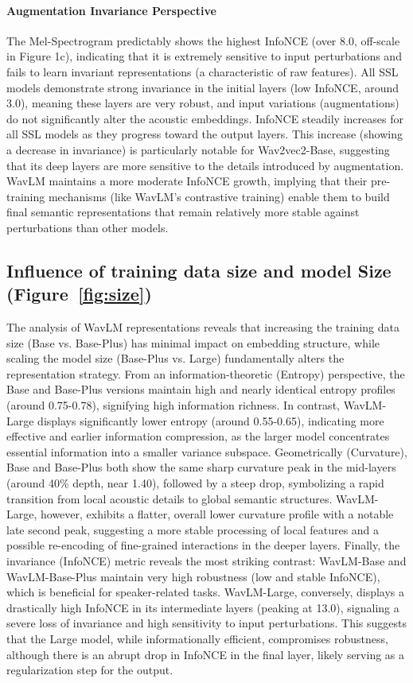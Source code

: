 \documentclass[5p]{elsarticle}
\begin{document}
\paragraph{Augmentation Invariance Perspective} The Mel-Spectrogram predictably shows the highest InfoNCE (over 8.0, off-scale in Figure 1c), indicating that it is extremely sensitive to input perturbations and fails to learn invariant representations (a characteristic of raw features). All SSL models demonstrate strong invariance in the initial layers (low InfoNCE, around 3.0), meaning these layers are very robust, and input variations (augmentations) do not significantly alter the acoustic embeddings. InfoNCE steadily increases for all SSL models as they progress toward the output layers. This increase (showing a decrease in invariance) is particularly notable for Wav2vec2-Base, suggesting that its deep layers are more sensitive to the details introduced by augmentation. WavLM maintains a more moderate InfoNCE growth, implying that their pre-training mechanisms (like WavLM's contrastive training) enable them to build final semantic representations that remain relatively more stable against perturbations than other models.


\subsection{Influence of training data size and model Size (Figure~\ref{fig:size})} The analysis of WavLM representations reveals that increasing the training data size (Base vs. Base-Plus) has minimal impact on embedding structure, while scaling the model size (Base-Plus vs. Large) fundamentally alters the representation strategy. From an information-theoretic (Entropy) perspective, the Base and Base-Plus versions maintain high and nearly identical entropy profiles (around 0.75-0.78), signifying high information richness. In contrast, WavLM-Large displays significantly lower entropy (around 0.55-0.65), indicating more effective and earlier information compression, as the larger model concentrates essential information into a smaller variance subspace. Geometrically (Curvature), Base and Base-Plus both show the same sharp curvature  peak in the mid-layers (around 40\% depth, near 1.40), followed by a steep drop, symbolizing a rapid transition from local acoustic details to global semantic structures. WavLM-Large, however, exhibits a flatter, overall lower curvature profile with a notable late second peak, suggesting a more stable processing of local features and a possible re-encoding of fine-grained interactions in the deeper layers. Finally, the invariance (InfoNCE) metric reveals the most striking  contrast: WavLM-Base and WavLM-Base-Plus maintain very high robustness (low and stable InfoNCE), which is beneficial for speaker-related tasks. WavLM-Large, conversely, displays a drastically high InfoNCE in its intermediate layers (peaking at 13.0), signaling a severe loss of invariance and high sensitivity to input perturbations. This suggests that the Large model, while informationally efficient, compromises robustness, although there is an abrupt drop in InfoNCE in the final layer, likely serving as a regularization step for the output.
\end{document}
